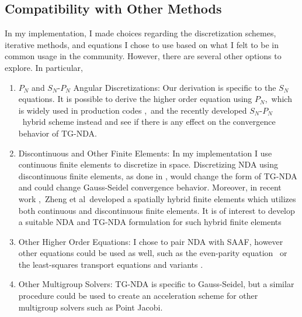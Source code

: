 \subsection{Compatibility with Other Methods}
In my implementation, I made choices regarding the discretization schemes, iterative methods, and equations I chose to use based on what I felt to be in common usage in the community. However, there are several other options to explore. In particular, 
\begin{enumerate}
\item $P_N$ and $S_N$-$P_N$ Angular Discretizations:
Our derivation is specific to the $S_N$ equations. It is possible to derive the higher order equation using $P_N$,\ which is widely used in production codes \cite{clifmc,wang2015},\ and the recently developed $S_N$-$P_N$\ hybrid scheme instead \cite{yaqi-wang-snpn,zheng-inl-report} and see if there is any effect on the convergence behavior of TG-NDA.
\item Discontinuous and Other Finite Elements:
In my implementation I use continuous finite elements to discretize in space. Discretizing NDA using discontinuous finite elements, as done in \cite{Schunert2017}, would change the form of TG-NDA and could change Gauss-Seidel convergence behavior. Moreover, in recent work \cite{zheng-ans17},\ Zheng et al\ developed a spatially hybrid finite elements which utilizes both continuous and discontinuous finite elements. It is of interest to develop a suitable NDA and TG-NDA formulation for such hybrid finite elements
\item Other Higher Order Equations:
I chose to pair NDA with SAAF, however other equations could be used as well, such as the even-parity equation \cite{Noh1996}\ or the least-squares transport equations and variants \cite{morel-holo,zheng-lspn,zheng-cdls}.
\item Other Multigroup Solvers:
TG-NDA is specific to Gauss-Seidel, but a similar procedure could be used to create an acceleration scheme for other multigroup solvers such as Point Jacobi.
\end{enumerate}

